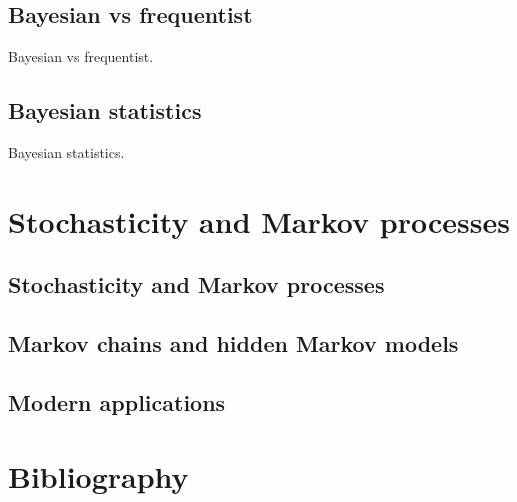 \documentclass{book}
\begin{document}
\section{Bayesian vs frequentist}
Bayesian vs frequentist.

\section{Bayesian statistics}
Bayesian statistics.


\chapter{Stochasticity and Markov processes}

\section{Stochasticity and Markov processes}

\section{Markov chains and hidden Markov models}

\section{Modern applications}


\backmatter

\chapter*{Bibliography}
\end{document}
